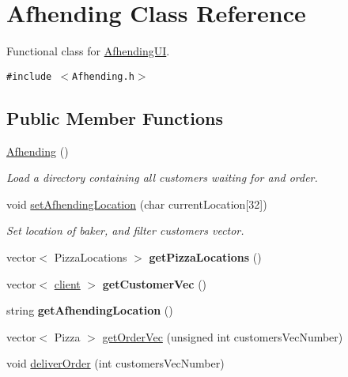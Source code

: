 \hypertarget{class_afhending}{
\section{Afhending Class Reference}
\label{class_afhending}
}
Functional class for \hyperlink{class_afhending_u_i}{Afhending\-UI}.  


{\tt \#include $<$Afhending.h$>$}

\subsection*{Public Member Functions}
\begin{CompactItemize}
\item 
\hypertarget{class_afhending_9365433a6f973ad929ffc0b458bc7c6f}{
\hyperlink{class_afhending_9365433a6f973ad929ffc0b458bc7c6f}{Afhending} ()}
\label{class_afhending_9365433a6f973ad929ffc0b458bc7c6f}

\begin{CompactList}\small\item\em Load a directory containing all customers waiting for and order. \item\end{CompactList}\item 
void \hyperlink{class_afhending_411cc45b50d4a59a33d76f6c54e52f78}{set\-Afhending\-Location} (char current\-Location\mbox{[}32\mbox{]})
\begin{CompactList}\small\item\em Set location of baker, and filter customers vector. \item\end{CompactList}\item 
\hypertarget{class_afhending_3d38e7498fba59674c7d3838bf4c1824}{
vector$<$ Pizza\-Locations $>$ {\bf get\-Pizza\-Locations} ()}
\label{class_afhending_3d38e7498fba59674c7d3838bf4c1824}

\item 
\hypertarget{class_afhending_3970b0afe27b514282442b11592e1602}{
vector$<$ \hyperlink{classclient}{client} $>$ {\bf get\-Customer\-Vec} ()}
\label{class_afhending_3970b0afe27b514282442b11592e1602}

\item 
\hypertarget{class_afhending_543bc751e47e95a5382a13e161387a1b}{
string {\bf get\-Afhending\-Location} ()}
\label{class_afhending_543bc751e47e95a5382a13e161387a1b}

\item 
vector$<$ Pizza $>$ \hyperlink{class_afhending_ad0cbeddec394b25c5eade57247f4110}{get\-Order\-Vec} (unsigned int customers\-Vec\-Number)
\item 
void \hyperlink{class_afhending_b3cb078e2502d2eb7e6e67623cbe30b9}{deliver\-Order} (int customers\-Vec\-Number)
\end{CompactItemize}
